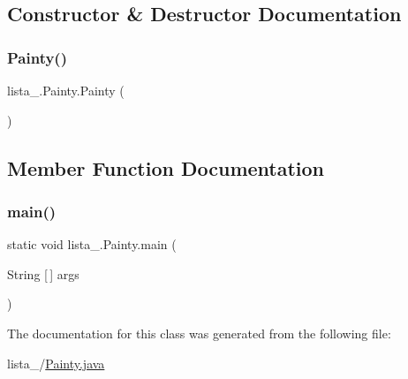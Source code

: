 \subsection{Constructor \& Destructor Documentation}
\mbox{\label{classlista__5_1_1_painty_a71b4b4d6f8515244d5bd42fe8673d5fd}} 
\subsubsection{\texorpdfstring{Painty()}{Painty()}}
{\footnotesize\ttfamily lista\+\_.\+Painty.\+Painty (\begin{DoxyParamCaption}{ }\end{DoxyParamCaption})}



\subsection{Member Function Documentation}
\mbox{\label{classlista__5_1_1_painty_a95e397e2f87f16ee08fae4bbf926635e}} 
\subsubsection{\texorpdfstring{main()}{main()}}
{\footnotesize\ttfamily static void lista\+\_.\+Painty.\+main (\begin{DoxyParamCaption}\item[{String \mbox{[}$\,$\mbox{]}}]{args }\end{DoxyParamCaption})\hspace{0.3cm}{\ttfamily [static]}}



The documentation for this class was generated from the following file\+:\begin{DoxyCompactItemize}
\item 
lista\+\_/\mbox{\hyperlink{_painty_8java}{Painty.\+java}}\end{DoxyCompactItemize}
